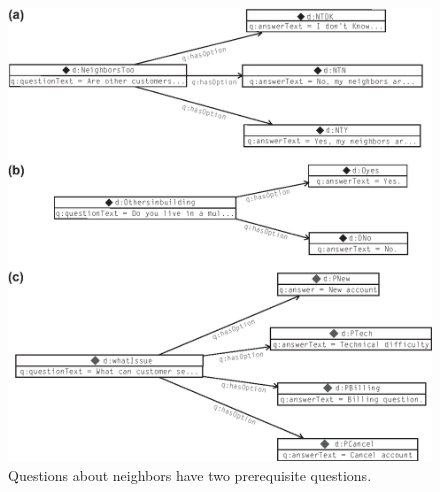 \begin{figure}
\centering
\includegraphics[width=5in]{media/ch12/f12-06.eps}
\caption{Questions about neighbors have two prerequisite questions.}
\label{fig:ch12.06}
\end{figure}

